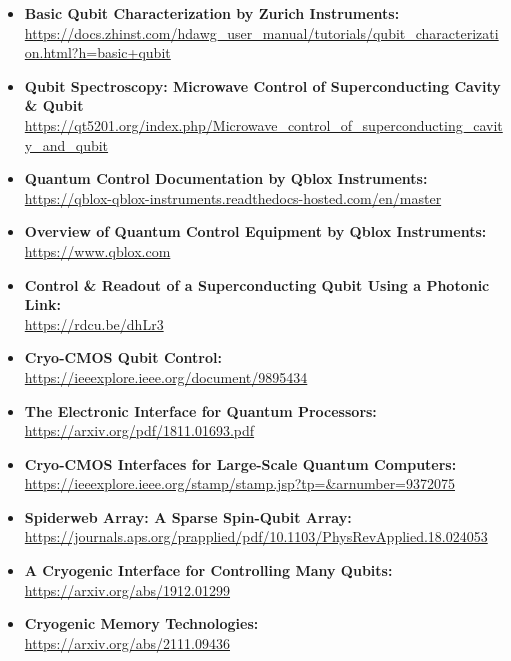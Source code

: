 \begin{itemize}
  \item\textbf{Basic Qubit Characterization by Zurich Instruments:}\\
\url{https://docs.zhinst.com/hdawg_user_manual/tutorials/qubit_characterization.html?h=basic+qubit}

  \item\textbf{Qubit Spectroscopy: Microwave Control of Superconducting Cavity \& Qubit}\\
\url{https://qt5201.org/index.php/Microwave_control_of_superconducting_cavity_and_qubit}

  \item\textbf{Quantum Control Documentation by Qblox Instruments:}\\
\url{https://qblox-qblox-instruments.readthedocs-hosted.com/en/master}

  \item\textbf{Overview of Quantum Control Equipment by Qblox Instruments:}\\
\url{https://www.qblox.com}

  \item\textbf{Control \& Readout of a Superconducting Qubit Using a Photonic Link:}\\
\url{https://rdcu.be/dhLr3}

  \item\textbf{Cryo-CMOS Qubit Control:}\\
\url{https://ieeexplore.ieee.org/document/9895434}

  \item\textbf{The Electronic Interface for Quantum Processors:}\\
\url{https://arxiv.org/pdf/1811.01693.pdf}

  \item\textbf{Cryo-CMOS Interfaces for Large-Scale Quantum Computers:}\\
\url{https://ieeexplore.ieee.org/stamp/stamp.jsp?tp=&arnumber=9372075}

  \item\textbf{Spiderweb Array: A Sparse Spin-Qubit Array:}\\
\url{https://journals.aps.org/prapplied/pdf/10.1103/PhysRevApplied.18.024053 }

  \item\textbf{A Cryogenic Interface for Controlling Many Qubits:}\\
\url{https://arxiv.org/abs/1912.01299}

  \item\textbf{Cryogenic Memory Technologies:}\\
\url{https://arxiv.org/abs/2111.09436}

\end{itemize}


